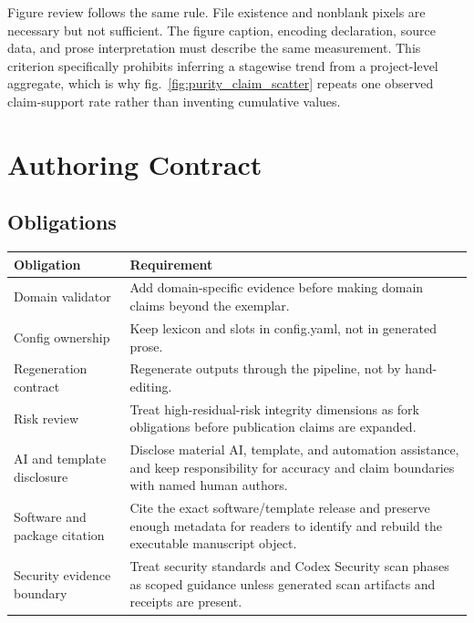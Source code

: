\documentclass[
  english,
]{article}
\newcounter{none} %
\begin{document}
Figure review follows the same rule. File existence and nonblank pixels
are necessary but not sufficient. The figure caption, encoding
declaration, source data, and prose interpretation must describe the
same measurement. This criterion specifically prohibits inferring a
stagewise trend from a project-level aggregate, which is why
fig.~\ref{fig:purity_claim_scatter} repeats one observed claim-support
rate rather than inventing cumulative values.

\newpage

\section{Authoring Contract}\label{sec:authoring_contract}

\subsection{Obligations}\label{obligations}

{\def\LTcaptype{none} %
\begin{longtable}[]{@{}
  >{\raggedright\arraybackslash}p{}
  >{\raggedright\arraybackslash}p{}@{}}
\toprule\noalign{}
\begin{minipage}[b]{\linewidth}\raggedright
Obligation
\end{minipage} & \begin{minipage}[b]{\linewidth}\raggedright
Requirement
\end{minipage} \\
\midrule\noalign{}
\endhead
\bottomrule\noalign{}
\endlastfoot
Domain validator & Add domain-specific evidence before making domain
claims beyond the exemplar. \\
Config ownership & Keep lexicon and slots in config.yaml, not in
generated prose. \\
Regeneration contract & Regenerate outputs through the pipeline, not by
hand-editing. \\
Risk review & Treat high-residual-risk integrity dimensions as fork
obligations before publication claims are expanded. \\
AI and template disclosure & Disclose material AI, template, and
automation assistance, and keep responsibility for accuracy and claim
boundaries with named human authors. \\
Software and package citation & Cite the exact software/template release
and preserve enough metadata for readers to identify and rebuild the
executable manuscript object. \\
Security evidence boundary & Treat security standards and Codex Security
scan phases as scoped guidance unless generated scan artifacts and
receipts are present. \\
\end{longtable}
}
\end{document}
